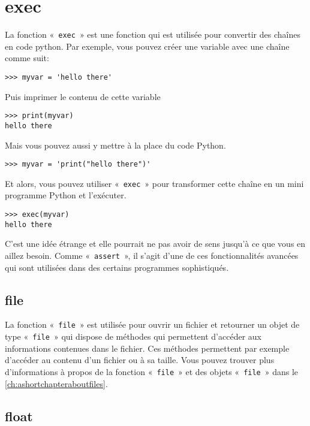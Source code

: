 \section*{exec}

La fonction «~\texttt{exec}~» est une fonction qui est utilisée pour convertir des chaînes en code python. Par exemple, vous pouvez créer une variable avec une chaîne comme suit:
\begin{Verbatim}[frame=single,rulecolor=\color{gray}]
>>> myvar = 'hello there'
\end{Verbatim}

Puis imprimer le contenu de cette variable
\begin{Verbatim}[frame=single,rulecolor=\color{gray}]
>>> print(myvar)
hello there
\end{Verbatim}

Mais vous pouvez aussi y mettre à la place du code Python.
\begin{Verbatim}[frame=single,rulecolor=\color{gray}]
>>> myvar = 'print("hello there")'
\end{Verbatim}

Et alors, vous pouvez utiliser «~\texttt{exec}~» pour transformer cette chaîne en un mini programme Python et l'exécuter.
\begin{Verbatim}[frame=single,rulecolor=\color{gray}]
>>> exec(myvar)
hello there
\end{Verbatim}

C'est une idée étrange et elle pourrait ne pas avoir de sens jusqu'à ce que vous en aillez besoin. Comme «~\texttt{assert}~», il s'agit d'une de ces fonctionnalités   avancées qui sont utilisées dans des certains programmes sophistiqués.


\subsection*{file}

La fonction «~\texttt{file}~» est utilisée pour ouvrir un fichier et retourner un objet de type «~\texttt{file}~» qui dispose de méthodes qui permettent d'accéder aux informations contenues dans le fichier. Ces méthodes permettent par exemple d'accéder au contenu d'un fichier ou à sa taille. Vous pouvez trouver plus d'informations à propos de la fonction «~\texttt{file}~» et des objets «~\texttt{file}~» dans le \autoref{ch:ashortchapteraboutfiles}.

\subsection*{float}

